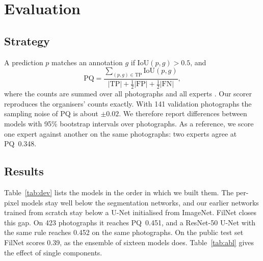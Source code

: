 \documentclass[sigconf]{acmart}
\newcommand{\noof}{423}              %
\newcommand{\oofpq}{0.451}           %
\newcommand{\rfiftypq}{0.452}        %
\begin{document}
\section{Evaluation}\label{sec:evaluation}

\subsection{Strategy}
A prediction $p$ matches an annotation $g$ if IoU$(p,g)>0.5$, and
\begin{equation}\label{eq:pq}
\mathrm{PQ}=\frac{\sum_{(p,g)\in\mathrm{TP}}\mathrm{IoU}(p,g)}{|\mathrm{TP}|+\frac12|\mathrm{FP}|+\frac12|\mathrm{FN}|},
\end{equation}
where the counts are summed over all photographs and all experts \cite{kirillov2019panoptic}. Our scorer reproduces the organisers' counts exactly. With 141 validation photographs the sampling noise of PQ is about $\pm0.02$. We therefore report differences between models with 95\% bootstrap intervals over photographs. As a reference, we score one expert against another on the same photographs: two experts agree at PQ~0.348.

\subsection{Results}
Table~\ref{tab:dev} lists the models in the order in which we built them. The per-pixel models stay well below the segmentation networks, and our earlier networks trained from scratch stay below a U-Net initialised from ImageNet. FilNet closes this gap. On \noof{} photographs it reaches PQ~\oofpq{}, and a ResNet-50 U-Net with the same rule reaches \rfiftypq{} on the same photographs. On the public test set FilNet scores 0.39, as the ensemble of sixteen models does. Table~\ref{tab:abl} gives the effect of single components.
\end{document}
